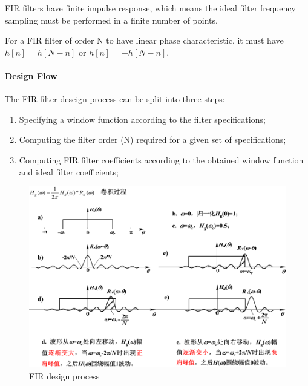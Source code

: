 FIR filters have finite impulse response, which means the ideal filter frequency sampling must be performed in a finite number of points.

For a FIR filter of order N to have linear phase characteristic, it must have $h[n]=h[N-n]$ or $h[n]=-h[N-n]$.

\paragraph{Design Flow} The FIR filter deseign process can be split into three steps:
\begin{enumerate}
  \item Specifying a window function according to the filter specifications;
  \item Computing the filter order (N) required for a given set of specifications;
  \item Computing FIR filter coefficients according to the obtained window function and ideal filter coefficients;
\end{enumerate}

\begin{figure}
  \centering
  \includegraphics[width=4.5in]{fig/fig_FIR_design.png}
  \caption{FIR design process}\label{fig_FIR_design}
\end{figure}
